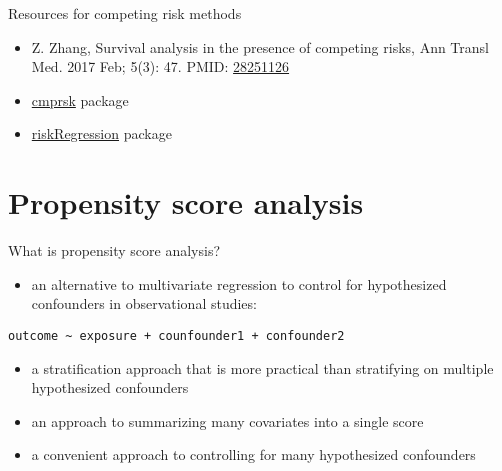 \documentclass[
  ignorenonframetext,
]{beamer}
\providecommand{\tightlist}{%
  \setlength{\itemsep}{0pt}\setlength{\parskip}{0pt}}
\begin{document}
\begin{frame}{Resources for competing risk methods}
\protect\hypertarget{resources-for-competing-risk-methods}{}

\begin{itemize}
\tightlist
\item
  Z. Zhang, Survival analysis in the presence of competing risks, Ann
  Transl Med. 2017 Feb; 5(3): 47. PMID:
  \href{https://www.ncbi.nlm.nih.gov/pubmed/28251126}{28251126}
\item
  \href{https://CRAN.R-project.org/package=cmprsk}{cmprsk} package
\item
  \href{https://cran.r-project.org/package=riskRegression}{riskRegression}
  package
\end{itemize}

\end{frame}

\hypertarget{propensity-score-analysis}{%
\section{Propensity score analysis}\label{propensity-score-analysis}}

\begin{frame}[fragile]{What is propensity score analysis?}
\protect\hypertarget{what-is-propensity-score-analysis}{}

\begin{itemize}
\tightlist
\item
  an alternative to multivariate regression to control for hypothesized
  confounders in observational studies:
\end{itemize}

\begin{verbatim}
outcome ~ exposure + counfounder1 + confounder2
\end{verbatim}

\begin{itemize}
\tightlist
\item
  a stratification approach that is more practical than stratifying on
  multiple hypothesized confounders
\item
  an approach to summarizing many covariates into a single score
\item
  a convenient approach to controlling for many hypothesized confounders
\end{itemize}

\end{frame}
\end{document}
